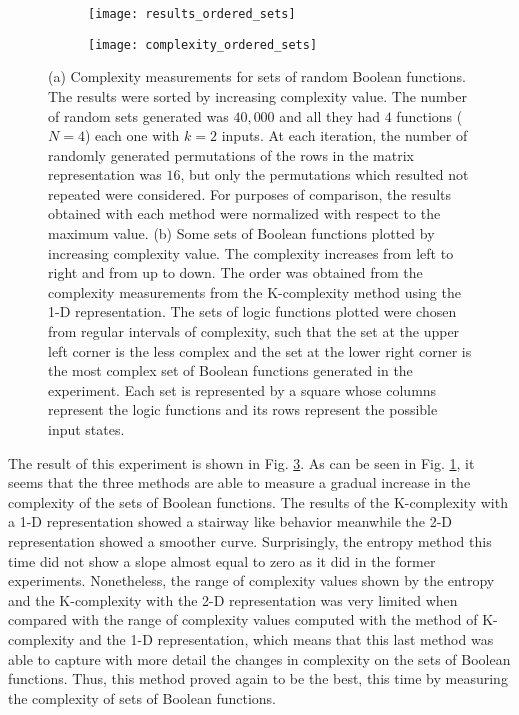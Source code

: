 \begin{figure}
	\centering
	\begin{subfigure}[b]{0.65\textwidth}
		\centering
		\texttt{[image: results\_ordered\_sets]}
		\caption{}
		\label{fig:results_ordered_sets}
	\end{subfigure}
	\hfill
	\begin{subfigure}[b]{0.6\textwidth}
		\centering
		\texttt{[image: complexity\_ordered\_sets]}
		\caption{}
		\label{fig:complexity_ordered_sets}
	\end{subfigure}
	\caption[Complexity measurements for sets of random Boolean functions sorted by increasing complexity value.]{(a) Complexity measurements for sets of random Boolean functions. The results were sorted by increasing complexity value. The number of random sets generated was $40,000$ and all they had $4$ functions ($N=4$) each one with $k=2$ inputs. At each iteration, the number of randomly generated permutations of the rows in the matrix representation was $16$, but only the permutations which resulted not repeated were considered. For purposes of comparison, the results obtained with each method were normalized with respect to the maximum value. (b) Some sets of Boolean functions plotted by increasing complexity value. The complexity increases from left to right and from up to down. The order was obtained from the complexity measurements from the K-complexity method using the 1-D representation. The sets of logic functions plotted were chosen from regular intervals of complexity, such that the set at the upper left corner is the less complex and the set at the lower right corner is the most complex set of Boolean functions generated in the experiment. Each set is represented by a square whose columns represent the logic functions and its rows represent the possible input states.}
	\label{fig:sets_bool_results}
\end{figure}

The result of this experiment is shown in Fig. \ref{fig:sets_bool_results}. As can be seen in Fig. \ref{fig:results_ordered_sets}, it seems that the three methods are able to measure a gradual increase in the complexity of the sets of Boolean functions. The results of the K-complexity with a 1-D representation showed a stairway like behavior meanwhile the 2-D representation showed a smoother curve. Surprisingly, the entropy method this time did not show a slope almost equal to zero as it did in the former experiments. Nonetheless, the range of complexity values shown by the entropy and the K-complexity with the 2-D representation was very limited when compared with the range of complexity values computed with the method of K-complexity and the 1-D representation, which means that this last method was able to capture with more detail the changes in complexity on the sets of Boolean functions. Thus, this method proved again to be the best, this time by measuring the complexity of sets of Boolean functions.\\

